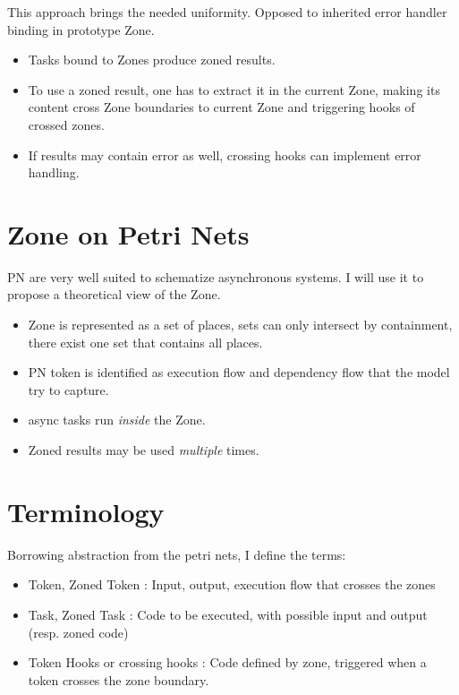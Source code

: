 This approach brings the needed uniformity. Opposed to inherited error handler binding in prototype Zone.

\begin{itemize}
\item Tasks bound to Zones produce zoned results.
\item To use a zoned result, one has to extract it in the current Zone, making its content cross Zone boundaries to current Zone and triggering hooks of crossed zones.
\item If results may contain error as well, crossing hooks can implement error handling.
\end{itemize}

\section{Zone on Petri Nets}

PN are very well suited to schematize asynchronous systems. I will use it to propose a theoretical view of the Zone.

\begin{itemize}
\item Zone is represented as a set of places, sets can only intersect by containment, there exist one set that contains all places.
\item PN token is identified as execution flow and dependency flow that the model try to capture.
\item async tasks run \emph{inside} the Zone.
\item Zoned results may be used \emph{multiple} times.
\end{itemize}

\section{Terminology}

Borrowing abstraction from the petri nets, I define the terms:

\begin{itemize}
\item Token, Zoned Token : Input, output, execution flow that crosses the zones
\item Task, Zoned Task : Code to be executed, with possible input and output (resp. zoned code)
\item Token Hooks or crossing hooks : Code defined by zone, triggered when a token crosses the zone boundary.
\end{itemize}

